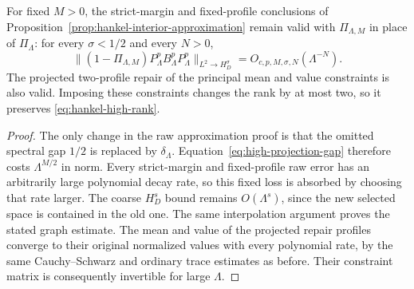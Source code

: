 \begin{proposition}
\label{prop:hankel-high-interior}
For fixed $M>0$, the strict-margin and fixed-profile conclusions
of Proposition~\ref{prop:hankel-interior-approximation} remain
valid with $\Pi_{\Lambda,M}$ in place of $\Pi_\Lambda$:
for every $\sigma<1/2$ and every $N>0$,
\[
 \|(1-\Pi_{\Lambda,M})P^p_\Lambda B^p_\Lambda P^p_\Lambda
                          \|_{L^2\to H_D^\sigma}
                                  =O_{c,p,M,\sigma,N}(\Lambda^{-N}).
\]
The projected two-profile repair of the principal mean and value
constraints is also valid. Imposing these constraints changes
the rank by at most two, so it preserves
\eqref{eq:hankel-high-rank}.
\end{proposition}
\begin{proof}
The only change in the raw approximation proof is that the
omitted spectral gap $1/2$ is replaced by $\delta_\Lambda$.
Equation~\eqref{eq:high-projection-gap} therefore costs
$\Lambda^{M/2}$ in norm. Every strict-margin and fixed-profile
raw error has an arbitrarily large polynomial decay rate, so
this fixed loss is absorbed by choosing that rate larger.
The coarse $H_D^s$ bound remains $O(\Lambda^s)$, since the new
selected space is contained in the old one. The same interpolation
argument proves the stated graph estimate. The mean and value
of the projected repair profiles converge to their original
normalized values with every polynomial rate, by the same
Cauchy--Schwarz and ordinary trace estimates as before. Their
constraint matrix is consequently invertible for large $\Lambda$.
\end{proof}


